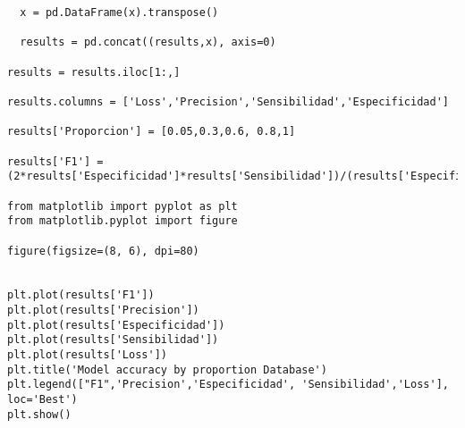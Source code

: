 \documentclass[10pt,riqno,a4paper,twoside]{article}\usepackage[]{graphicx}\usepackage[]{color}
\begin{document}
\begin{lstlisting}
  x = pd.DataFrame(x).transpose()

  results = pd.concat((results,x), axis=0)

results = results.iloc[1:,]

results.columns = ['Loss','Precision','Sensibilidad','Especificidad']

results['Proporcion'] = [0.05,0.3,0.6, 0.8,1]

results['F1'] = (2*results['Especificidad']*results['Sensibilidad'])/(results['Especificidad']+results['Sensibilidad'])

from matplotlib import pyplot as plt
from matplotlib.pyplot import figure

figure(figsize=(8, 6), dpi=80)


plt.plot(results['F1'])
plt.plot(results['Precision'])
plt.plot(results['Especificidad'])
plt.plot(results['Sensibilidad'])
plt.plot(results['Loss'])
plt.title('Model accuracy by proportion Database')
plt.legend(["F1",'Precision','Especificidad', 'Sensibilidad','Loss'], loc='Best')
plt.show()


\end{lstlisting}
\end{document}
